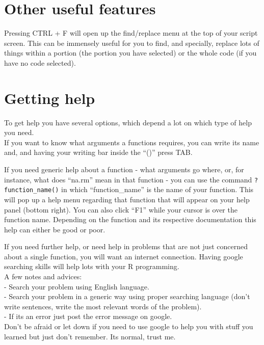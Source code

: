\documentclass[
]{book}
\begin{document}
\hypertarget{other-useful-features}{%
\section{Other useful features}\label{other-useful-features}}

Pressing CTRL + F will open up the find/replace menu at the top of your script screen.
This can be immensely useful for you to find, and specially, replace lots of things within a portion (the portion you have selected) or the whole code (if you have no code selected).

\hypertarget{getting-help}{%
\section{Getting help}\label{getting-help}}

To get help you have several options, which depend a lot on which type of help you need.\\
If you want to know what arguments a functions requires, you can write its name and, and having your writing bar inside the ``()'' press TAB.

If you need generic help about a function - what arguments go where, or, for instance, what does ``na.rm'' mean in that function - you can use the command \texttt{?function\_name()} in which ``function\_name'' is the name of your function.
This will pop up a help menu regarding that function that will appear on your help panel (bottom right).
You can also click ``F1'' while your cursor is over the function name.
Depending on the function and its respective documentation this help can either be good or poor.

If you need further help, or need help in problems that are not just concerned about a single function, you will want an internet connection.
Having google searching skills will help lots with your R programming.\\
A few notes and advices:\\
- Search your problem using English language.\\
- Search your problem in a generic way using proper searching language (don't write sentences, write the most relevant words of the problem).\\
- If its an error just post the error message on google.\\

Don't be afraid or let down if you need to use google to help you with stuff you learned but just don't remember.
Its normal, trust me.
\end{document}

